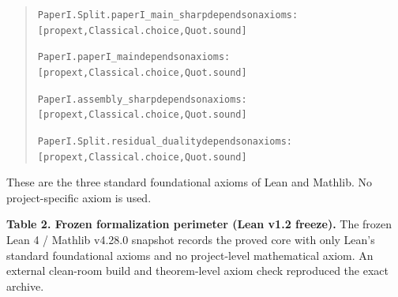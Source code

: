 \documentclass[english,11pt,a4paper]{article}
\begin{document}
\begin{quote}
{\LeanSymbols\fontsize{8}{10}\selectfont
\noindent \nolinkurl{PaperI.Split.paperI_main_sharp}\hspace{0.45em}\nolinkurl{depends}\hspace{0.45em}\nolinkurl{on}\hspace{0.45em}\nolinkurl{axioms:}\hspace{0.45em}\nolinkurl{[propext,}\hspace{0.45em}\nolinkurl{Classical.choice,}\hspace{0.45em}\nolinkurl{Quot.sound]}\par
\noindent \nolinkurl{PaperI.paperI_main}\hspace{4.05em}\nolinkurl{depends}\hspace{0.45em}\nolinkurl{on}\hspace{0.45em}\nolinkurl{axioms:}\hspace{0.45em}\nolinkurl{[propext,}\hspace{0.45em}\nolinkurl{Classical.choice,}\hspace{0.45em}\nolinkurl{Quot.sound]}\par
\noindent \nolinkurl{PaperI.assembly_sharp}\hspace{2.7em}\nolinkurl{depends}\hspace{0.45em}\nolinkurl{on}\hspace{0.45em}\nolinkurl{axioms:}\hspace{0.45em}\nolinkurl{[propext,}\hspace{0.45em}\nolinkurl{Classical.choice,}\hspace{0.45em}\nolinkurl{Quot.sound]}\par
\noindent \nolinkurl{PaperI.Split.residual_duality}\hspace{0.45em}\nolinkurl{depends}\hspace{0.45em}\nolinkurl{on}\hspace{0.45em}\nolinkurl{axioms:}\hspace{0.45em}\nolinkurl{[propext,}\hspace{0.45em}\nolinkurl{Classical.choice,}\hspace{0.45em}\nolinkurl{Quot.sound]}\par
}
\end{quote}

These are the three standard foundational axioms of Lean and Mathlib. No
project-specific axiom is used.

\textbf{Table 2. Frozen formalization perimeter (Lean v1.2 freeze).} The
frozen Lean 4 / Mathlib v4.28.0 snapshot records the proved core with
only Lean's standard foundational axioms and no project-level
mathematical axiom. An external clean-room build and theorem-level axiom
check reproduced the exact archive.
\end{document}
